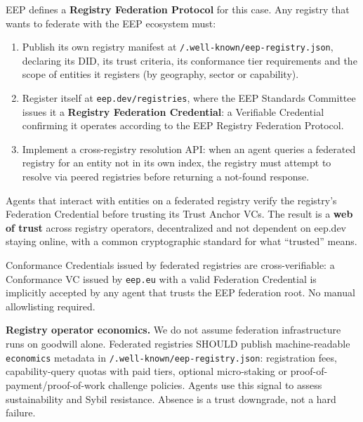 \documentclass[12pt,a4paper]{article}
\begin{document}
EEP defines a \textbf{Registry Federation Protocol} for this case. Any registry that wants to federate with the EEP ecosystem must:

\begin{enumerate}
    \item Publish its own registry manifest at \texttt{/.well-known/eep-registry.json}, declaring its DID, its trust criteria, its conformance tier requirements and the scope of entities it registers (by geography, sector or capability).
    \item Register itself at \texttt{eep.dev/registries}, where the EEP Standards Committee issues it a \textbf{Registry Federation Credential}: a Verifiable Credential confirming it operates according to the EEP Registry Federation Protocol.
    \item Implement a cross-registry resolution API: when an agent queries a federated registry for an entity not in its own index, the registry must attempt to resolve via peered registries before returning a not-found response.
\end{enumerate}

Agents that interact with entities on a federated registry verify the registry's Federation Credential before trusting its Trust Anchor VCs. The result is a \textbf{web of trust} across registry operators, decentralized and not dependent on eep.dev staying online, with a common cryptographic standard for what ``trusted'' means.

Conformance Credentials issued by federated registries are cross-verifiable: a Conformance VC issued by \texttt{eep.eu} with a valid Federation Credential is implicitly accepted by any agent that trusts the EEP federation root. No manual allowlisting required.

\textbf{Registry operator economics.} We do not assume federation infrastructure runs on goodwill alone. Federated registries SHOULD publish machine-readable \texttt{economics} metadata in \texttt{/.well-known/eep-registry.json}: registration fees, capability-query quotas with paid tiers, optional micro-staking or proof-of-payment/proof-of-work challenge policies. Agents use this signal to assess sustainability and Sybil resistance. Absence is a trust downgrade, not a hard failure.

\end{document}
